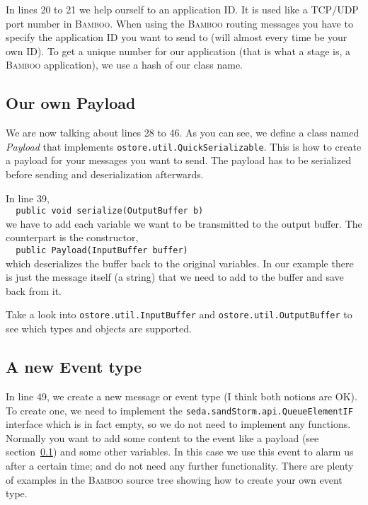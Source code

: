 \documentclass[twocolumn, twoside, a4paper]{article}
\begin{document}
In lines 20 to 21 we help ourself to an application ID. It is used
like a TCP/UDP port number in \textsc{Bamboo}. When using the \textsc{Bamboo} routing
messages you have to specify the application ID you want to send to
(will almost every time be your own ID). To get a unique number for our
application (that is what a stage is, a \textsc{Bamboo} application), we use a
hash of our class name.


\subsection{Our own Payload}
\label{sec:payload}

We are now talking about lines 28 to 46. As you can see, we define a
class named \emph{Payload} that implements
\texttt{ostore.util.QuickSerializable}. This is how to create a
payload for your messages you want to send. The payload has to be
serialized before sending and deserialization afterwards.

In line 39,\\
\lstinline$  public void serialize(OutputBuffer b)$ \\
we have to add each variable we want to be transmitted to the output
buffer. The counterpart is the constructor,\\
\lstinline$  public Payload(InputBuffer buffer)$ \\
which deserializes the buffer back to the original variables. In our
example there is just the message itself (a string) that we need to
add to the buffer and save back from it.

Take a look into \texttt{ostore.util.InputBuffer} and
\texttt{ostore.util.OutputBuffer} to see which types and objects are
supported.


\subsection{A new Event type}
\label{sec:newevent}

In line 49, we create a new message or event type (I think both notions
are OK). To create one, we need to implement the
\texttt{seda.sandStorm.api.QueueElementIF} interface which is in fact
empty, so we do not need to implement any functions. Normally you want
to add some content to the event like a payload (see
section~\ref{sec:payload}) and some other variables. In this case we
use this event to alarm us after a certain time; and do not need
any further functionality. There are plenty of examples in the \textsc{Bamboo}
source tree showing how to create your own event type.
\end{document}
